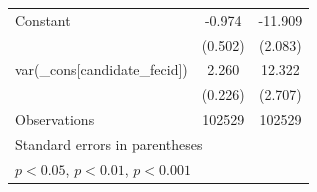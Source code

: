 \begin{tabular}{l*{2}{c}}
Constant            &      -0.974         &     -11.909\sym{***}\\
                    &     (0.502)         &     (2.083)         \\
\midrule
var(\_cons[candidate\_fecid])&       2.260\sym{***}&      12.322\sym{***}\\
                    &     (0.226)         &     (2.707)         \\
\midrule
Observations        &      102529         &      102529         \\
\bottomrule
\multicolumn{3}{l}{\footnotesize Standard errors in parentheses}\\
\multicolumn{3}{l}{\footnotesize \sym{*} \(p<0.05\), \sym{**} \(p<0.01\), \sym{***} \(p<0.001\)}\\
\end{tabular}
